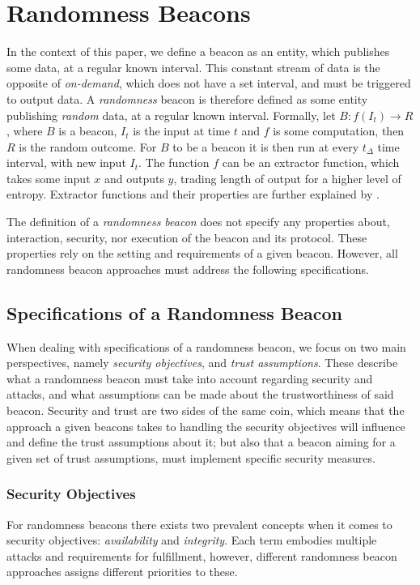 \section{Randomness Beacons}
In the context of this paper, we define a beacon as an entity, which publishes some data, at a regular known interval.
This constant stream of data is the opposite of \emph{on-demand}, which does not have a set interval, and must be triggered to output data.
A \emph{randomness} beacon is therefore defined as some entity publishing \emph{random} data, at a regular known interval.
Formally, let $B: f(I_t) \rightarrow R$, where $B$ is a beacon, $I_t$ is the input at time $t$ and $f$ is some computation, then $R$ is the random outcome.
For $B$ to be a beacon it is then run at every $t_\Delta$ time interval, with new input $I_t$.
The function $f$ can be an extractor function, which takes some input $x$ and outputs $y$, trading length of output for a higher level of entropy.
Extractor functions and their properties are further explained by \citet{bonneau2015bitcoin}.

The definition of a \emph{randomness beacon} does not specify any properties about, interaction, security, nor execution of the beacon and its protocol.
These properties rely on the setting and requirements of a given beacon.
However, all randomness beacon approaches must address the following specifications.

\subsection{Specifications of a Randomness Beacon}
When dealing with specifications of a randomness beacon, we focus on two main perspectives, namely \emph{security objectives}, and \emph{trust assumptions}.
These describe what a randomness beacon must take into account regarding security and attacks, and what assumptions can be made about the trustworthiness of said beacon.
Security and trust are two sides of the same coin, which means that the approach a given beacons takes to handling the security objectives will influence and define the trust assumptions about it;
but also that a beacon aiming for a given set of trust assumptions, must implement specific security measures.
\subsubsection{Security Objectives}\label{ssub:security_objectives}
For randomness beacons there exists two prevalent concepts when it comes to security objectives: \emph{availability} and \emph{integrity}.
Each term embodies multiple attacks and requirements for fulfillment, however, different randomness beacon approaches assigns different priorities to these.

